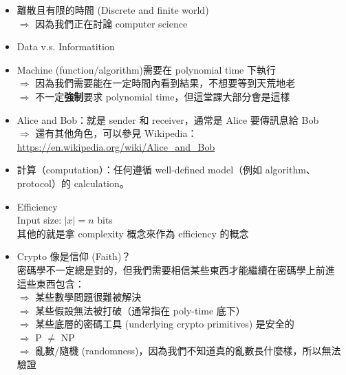 \begin{itemize}[itemsep=10pt]
	\item 離散且有限的時間 (Discrete and finite world) \\
		\(\Rightarrow\) 因為我們正在討論 computer science
		
	\item Data v.s. Informatition
	
	\item Machine (function/algorithm)需要在 polynomial time 下執行 \\
		\(\Rightarrow\) 因為我們需要能在一定時間內看到結果，不想要等到天荒地老 \\
		\(\Rightarrow\) 不一定\textbf{強制}要求 polynomial time，但這堂課大部分會是這樣
		
	\item Alice and Bob：就是 sender 和 receiver，通常是 Alice 要傳訊息給 Bob \\
		\(\Rightarrow\) 還有其他角色，可以參見 Wikipedia： \\
		\url{https://en.wikipedia.org/wiki/Alice_and_Bob}
		
	\item 計算（computation）：任何遵循 well-defined model（例如 algorithm、protocol）的 calculation。
	
	\item Efficiency \\
		Input size: \(|x| = n\) bits \\
		其他的就是拿 complexity 概念來作為 efficiency 的概念
		
	\item Crypto 像是信仰 (Faith)？ \\
		密碼學不一定總是對的，但我們需要相信某些東西才能繼續在密碼學上前進 \\
		這些東西包含： \\ 
		\(\Rightarrow\) 某些數學問題很難被解決 \\
		\(\Rightarrow\) 某些假設無法被打破（通常指在 poly-time 底下） \\
		\(\Rightarrow\) 某些底層的密碼工具 (underlying crypto primitives) 是安全的 \\
		\(\Rightarrow\) P \(\neq\) NP \\
		\(\Rightarrow\) 亂數/隨機 (randomness)，因為我們不知道真的亂數長什麼樣，所以無法驗證
\end{itemize}











